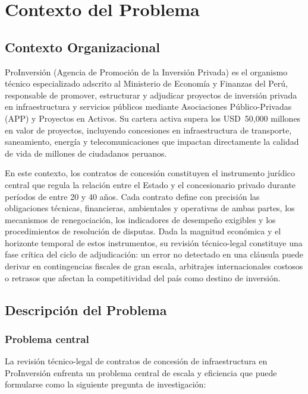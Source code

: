 \chapter{Contexto del Problema}

\section{Contexto Organizacional}

ProInversión (Agencia de Promoción de la Inversión Privada) es el organismo técnico
especializado adscrito al Ministerio de Economía y Finanzas del Perú, responsable
de promover, estructurar y adjudicar proyectos de inversión privada en infraestructura
y servicios públicos mediante Asociaciones Público-Privadas (APP) y Proyectos en
Activos. Su cartera activa supera los USD~50{,}000 millones en valor de proyectos,
incluyendo concesiones en infraestructura de transporte, saneamiento, energía y
telecomunicaciones que impactan directamente la calidad de vida de millones de
ciudadanos peruanos.

En este contexto, los contratos de concesión constituyen el instrumento jurídico
central que regula la relación entre el Estado y el concesionario privado durante
períodos de entre 20 y 40 años. Cada contrato define con precisión las obligaciones
técnicas, financieras, ambientales y operativas de ambas partes, los mecanismos de
renegociación, los indicadores de desempeño exigibles y los procedimientos de
resolución de disputas. Dada la magnitud económica y el horizonte temporal de estos
instrumentos, su revisión técnico-legal constituye una fase crítica del ciclo de
adjudicación: un error no detectado en una cláusula puede derivar en contingencias
fiscales de gran escala, arbitrajes internacionales costosos o retrasos que afectan
la competitividad del país como destino de inversión.

\section{Descripción del Problema}

\subsection{Problema central}

La revisión técnico-legal de contratos de concesión de infraestructura en ProInversión
enfrenta un problema central de escala y eficiencia que puede formularse como la
siguiente pregunta de investigación:

